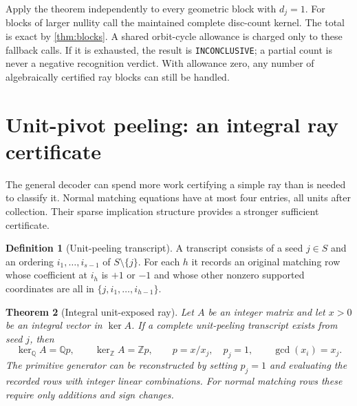 \documentclass[11pt,a4paper]{article}
\newtheorem{theorem}{Theorem}[section]
\theoremstyle{definition}
\newtheorem{definition}[theorem]{Definition}
\newcommand{\Q}{\mathbb Q}
\newcommand{\Z}{\mathbb Z}
\newcommand{\code}[1]{{\small\nolinkurl{#1}}}
\begin{document}
Apply the theorem independently to every geometric block with $d_j=1$.
For blocks of larger nullity call the maintained complete disc-count kernel.
The total is exact by \cref{thm:blocks}.  A shared orbit-cycle allowance is
charged only to these fallback calls.  If it is exhausted, the result is
\code{INCONCLUSIVE}; a partial count is never a negative recognition verdict.
With allowance zero, any number of algebraically certified ray blocks can
still be handled.

\section{Unit-pivot peeling: an integral ray certificate}
\label{sec:peeling}

The general decoder can spend more work certifying a simple ray than is
needed to classify it.  Normal matching equations have at most four entries,
all units after collection.  Their sparse implication structure provides a
stronger sufficient certificate.

\begin{definition}[Unit-peeling transcript]
A transcript consists of a seed $j\in S$ and an ordering
$i_1,\ldots,i_{s-1}$ of $S\setminus\{j\}$.  For each $h$ it records an original
matching row whose coefficient at $i_h$ is $+1$ or $-1$ and whose other
nonzero supported coordinates are all in $\{j,i_1,\ldots,i_{h-1}\}$.
\end{definition}

\begin{theorem}[Integral unit-exposed ray]
\label{thm:peeling}
Let $A$ be an integer matrix and let $x>0$ be an integral vector in $\ker A$.
If a complete unit-peeling transcript exists from seed $j$, then
\begin{equation}
 \ker_{\Q}A=\Q p,\qquad
 \ker_{\Z}A=\Z p,\qquad
 p=x/x_j,\quad p_j=1,\qquad \gcd(x_i)=x_j.     \label{eq:unitray}
\end{equation}
The primitive generator can be reconstructed by setting $p_j=1$ and evaluating
the recorded rows with integer linear combinations.  For normal matching rows
these require only additions and sign changes.
\end{theorem}
\end{document}
